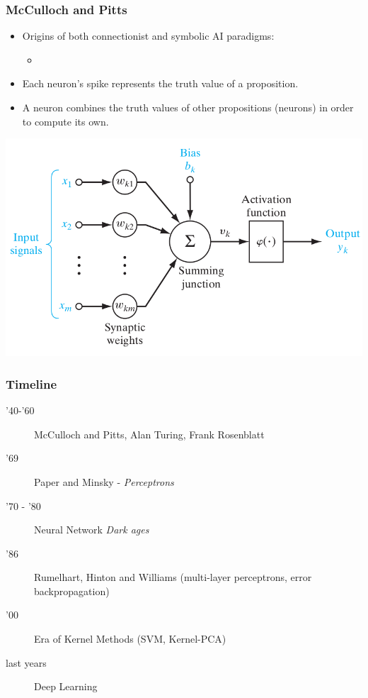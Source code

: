 \begin{frame}
  \frametitle{McCulloch and Pitts}
  \begin{itemize}
  \item Origins of both connectionist and symbolic AI paradigms:
    \begin{itemize}
    \item {}
    \end{itemize}
  \item Each neuron's spike represents the truth value of a
    proposition.
  \item A neuron combines the truth values of other propositions
    (neurons) in order to compute its own.
  \end{itemize}
  \begin{center}
    \includegraphics[height=.4\textheight]{graphics/neuron_model_haykin.png}
  \end{center}
\end{frame}

\begin{frame}
  \frametitle{Timeline}
  \begin{description}
  \item['40-'60] McCulloch and Pitts, Alan Turing, Frank Rosenblatt
  \item['69] Paper and Minsky - \emph{Perceptrons}
  \item['70 - '80] Neural Network \emph{Dark ages}
  \item['86] Rumelhart, Hinton and Williams (multi-layer perceptrons,
    error backpropagation)
  \item['00] Era of Kernel Methods (SVM, Kernel-PCA)
  \item[last years] Deep Learning
  \end{description}
\end{frame}

